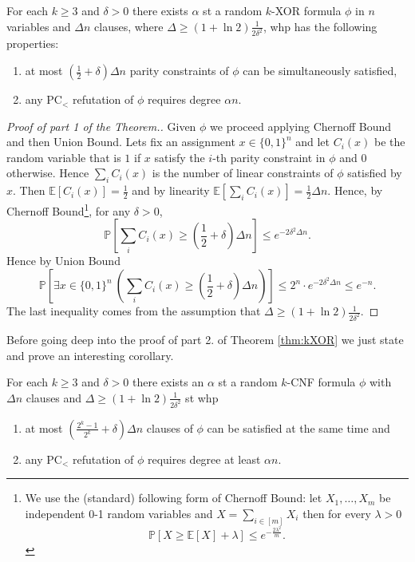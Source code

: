 \documentclass[a4paper,twoside,justified]{tufte-handout}
\begin{document}
\begin{theorem}\label{thm:kXOR}
For each $k\geq 3$ and $\delta>0$ there exists $\alpha$ st a random $k$-XOR formula $\phi$ in $n$ variables and $\Delta n$ clauses, where $\Delta \geq (1+\ln 2)\frac{1}{2\delta^2}$, whp has the following properties:
\begin{enumerate}
\item at most $\left( \frac{1}{2}+\delta\right)\Delta n$ parity constraints of $\phi$ can be simultaneously satisfied,
\item any PC$_<$ refutation of $\phi$ requires degree $\alpha n$.
\end{enumerate}
\end{theorem}

\begin{proof}[Proof of part 1 of the Theorem.]
Given $\phi$ we proceed applying Chernoff Bound and then Union Bound. Lets fix an assignment $x\in \{0,1\}^n$ and let $C_i(x)$ be the random variable that is $1$ if $x$ satisfy the $i$-th parity constraint in $\phi$ and $0$ otherwise. Hence $\sum_i C_i(x)$ is the number of linear constraints of $\phi$ satisfied by $x$. Then $\mathbb{E}[C_i(x)]=\frac{1}{2}$ and by linearity $
\mathbb{E}[\sum_i C_i(x)]=\frac{1}{2}\Delta n$.
Hence, by Chernoff Bound\footnote{
We use the (standard) following form of Chernoff Bound: let $X_1,\ldots, X_m$ be independent 0-1 random variables and $X=\sum_{i\in [m]} X_i$ then for every $\lambda >0$ 
\begin{equation*}
\mathbb{P}\left[X\geq \mathbb{E}[X]+\lambda\right]\leq e^{-\frac{2\lambda^2}{m}}.
\end{equation*}

}, for any $\delta>0$,
\begin{equation*}
\mathbb{P}\left[\sum_i C_i(x)\geq (\frac{1}{2}+\delta)\Delta n\right]\leq e^{-2\delta^2\Delta n}.
\end{equation*}
Hence by Union Bound 
\begin{equation*}
\mathbb{P}\left[\exists x\in \{0,1\}^n\ \left(\sum_i C_i(x)\geq (\frac{1}{2}+\delta)\Delta n\right)\right]\leq 2^n \cdot e^{-2\delta^2\Delta n}\leq e^{-n}.
\end{equation*}
The last inequality comes from the assumption that $\Delta\geq (1+\ln 2)\frac{1}{2\delta^2}$.
\end{proof}
Before going deep into the proof of part 2. of Theorem \ref{thm:kXOR} we just state and prove an interesting corollary.

\begin{corollary}\label{cor:randomCNF}
For each $k\geq 3$ and $\delta>0$ there exists an $\alpha$ st a random $k$-CNF formula $\phi$ with $\Delta n$ clauses and $\Delta\geq (1+\ln 2)\frac{1}{2\delta^2}$ st whp
\begin{enumerate}
\item at most $\left(\frac{2^k-1}{2^k}+\delta\right)\Delta n$ clauses of $\phi$ can be satisfied at the same time and
\item any PC$_<$ refutation of $\phi$ requires degree at least $\alpha n$.
\end{enumerate}
\end{corollary}
\end{document}
